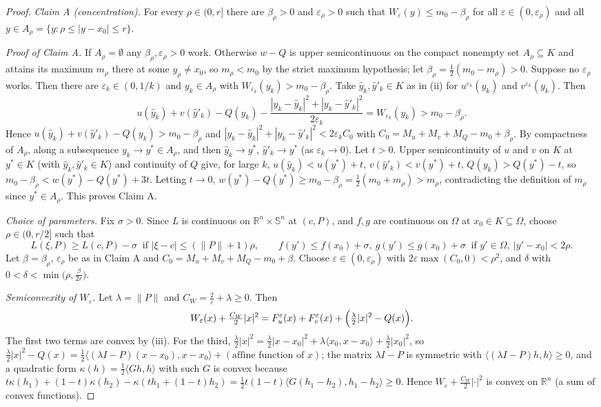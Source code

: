 \begin{proof}
\emph{Claim A (concentration).} For every $\rho\in(0,r]$ there are $\beta_\rho>0$ and $\varepsilon_\rho>0$ such that $W_\varepsilon(y)\le m_0-\beta_\rho$ for all $\varepsilon\in(0,\varepsilon_\rho)$ and all $y\in A_\rho=\{y:\rho\le|y-x_0|\le r\}$.

\noindent\emph{Proof of Claim A.} If $A_\rho=\emptyset$ any $\beta_\rho,\varepsilon_\rho>0$ work. Otherwise $w-Q$ is upper semicontinuous on the compact nonempty set $A_\rho\subseteq K$ and attains its maximum $m_\rho$ there at some $y_\rho\ne x_0$, so $m_\rho<m_0$ by the strict maximum hypothesis; let $\beta_\rho=\frac12(m_0-m_\rho)>0$. Suppose no $\varepsilon_\rho$ works. Then there are $\varepsilon_k\in(0,1/k)$ and $y_k\in A_\rho$ with $W_{\varepsilon_k}(y_k)>m_0-\beta_\rho$. Take $\hat y_k,\hat y'_k\in K$ as in (ii) for $u^{\varepsilon_k}(y_k)$ and $v^{\varepsilon_k}(y_k)$. Then
\[
u(\hat y_k)+v(\hat y'_k)-Q(y_k)-\frac{|y_k-\hat y_k|^2+|y_k-\hat y'_k|^2}{2\varepsilon_k}=W_{\varepsilon_k}(y_k)>m_0-\beta_\rho .
\]
Hence $u(\hat y_k)+v(\hat y'_k)-Q(y_k)>m_0-\beta_\rho$ and $|y_k-\hat y_k|^2+|y_k-\hat y'_k|^2<2\varepsilon_kC_0$ with $C_0=M_u+M_v+M_Q-m_0+\beta_\rho$. By compactness of $A_\rho$, along a subsequence $y_k\to y^*\in A_\rho$, and then $\hat y_k\to y^*$, $\hat y'_k\to y^*$ (as $\varepsilon_k\to0$). Let $t>0$. Upper semicontinuity of $u$ and $v$ on $K$ at $y^*\in K$ (with $\hat y_k,\hat y'_k\in K$) and continuity of $Q$ give, for large $k$, $u(\hat y_k)<u(y^*)+t$, $v(\hat y'_k)<v(y^*)+t$, $Q(y_k)>Q(y^*)-t$, so $m_0-\beta_\rho<w(y^*)-Q(y^*)+3t$. Letting $t\to0$, $w(y^*)-Q(y^*)\ge m_0-\beta_\rho=\frac12(m_0+m_\rho)>m_\rho$, contradicting the definition of $m_\rho$ since $y^*\in A_\rho$. This proves Claim A.

\emph{Choice of parameters.} Fix $\sigma>0$. Since $L$ is continuous on $\mathbb R^n\times\mathbb S^n$ at $(c,P)$, and $f,g$ are continuous on $\Omega$ at $x_0\in K\subseteq\Omega$, choose $\rho\in(0,r/2]$ such that
\[
L(\xi,P)\ge L(c,P)-\sigma\ \text{ if }|\xi-c|\le(\|P\|+1)\rho,\qquad f(y')\le f(x_0)+\sigma,\ g(y')\le g(x_0)+\sigma\ \text{ if }y'\in\Omega,\ |y'-x_0|<2\rho. \tag{3}
\]
Let $\beta=\beta_\rho$, $\varepsilon_\rho$ be as in Claim A and $C_0=M_u+M_v+M_Q-m_0+\beta$. Choose $\varepsilon\in(0,\varepsilon_\rho)$ with $2\varepsilon\max(C_0,0)<\rho^2$, and $\delta$ with $0<\delta<\min\bigl(\rho,\frac{\beta}{2r}\bigr)$.

\emph{Semiconvexity of $W_\varepsilon$.} Let $\lambda=\|P\|$ and $C_W=\frac2\varepsilon+\lambda\ge0$. Then
\[
W_\varepsilon(x)+\tfrac{C_W}2|x|^2=F_u^\varepsilon(x)+F_v^\varepsilon(x)+\Bigl(\tfrac\lambda2|x|^2-Q(x)\Bigr).
\]
The first two terms are convex by (iii). For the third, $\frac\lambda2|x|^2=\frac\lambda2|x-x_0|^2+\lambda\langle x_0,x-x_0\rangle+\frac\lambda2|x_0|^2$, so $\frac\lambda2|x|^2-Q(x)=\frac12\langle(\lambda I-P)(x-x_0),x-x_0\rangle+(\text{affine function of }x)$; the matrix $\lambda I-P$ is symmetric with $\langle(\lambda I-P)h,h\rangle\ge0$, and a quadratic form $\kappa(h)=\frac12\langle Gh,h\rangle$ with such $G$ is convex because $t\kappa(h_1)+(1-t)\kappa(h_2)-\kappa(th_1+(1-t)h_2)=\frac12t(1-t)\langle G(h_1-h_2),h_1-h_2\rangle\ge0$. Hence $W_\varepsilon+\frac{C_W}2|\cdot|^2$ is convex on $\mathbb R^n$ (a sum of convex functions).


\end{proof}
